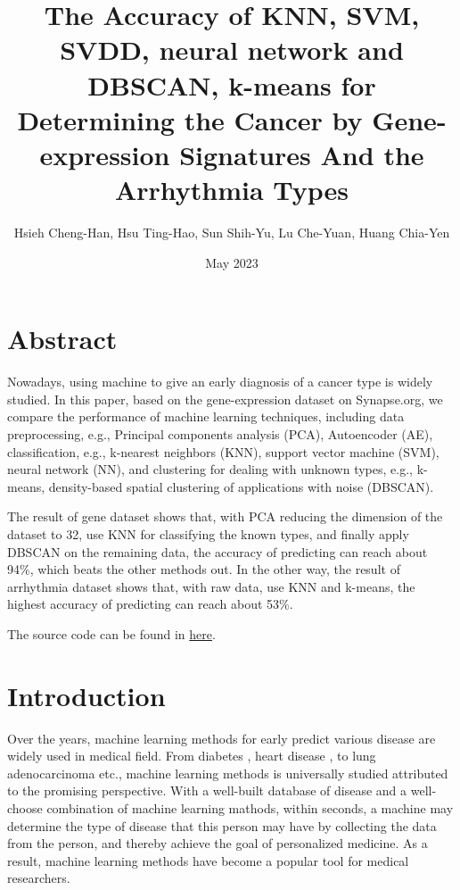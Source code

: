 \documentclass[twocolumn,10pt]{article}
\begin{document}
\title{The Accuracy of KNN, SVM, SVDD, neural network and DBSCAN, k-means for Determining the Cancer by Gene-expression Signatures And the Arrhythmia Types}

\author{Hsieh Cheng-Han, Hsu Ting-Hao, Sun Shih-Yu, Lu Che-Yuan, Huang Chia-Yen}
\date{May 2023}
\maketitle

\section*{Abstract}
Nowadays, using machine to give an early diagnosis of a cancer type is widely studied. 
In this paper, based on the gene-expression dataset on Synapse.org, we compare the performance of machine 
learning techniques, including data preprocessing, e.g., Principal components analysis (PCA), Autoencoder 
(AE), classification, e.g., k-nearest neighbors (KNN), support vector machine (SVM), neural network (NN), 
and clustering for dealing with unknown types, e.g., k-means, density-based spatial clustering of 
applications with noise (DBSCAN). 

The result of gene dataset shows that, with PCA reducing the dimension of the dataset to 32, use KNN for 
classifying the known types, and finally apply DBSCAN on the remaining data, the accuracy of predicting 
can reach about 94\%, which beats the other methods out. In the other way, the result of arrhythmia 
dataset shows that, with raw data, use KNN and k-means, the highest accuracy of predicting can reach about 
53\%.

The source code can be found in \href{https://github.com/OEmiliatanO/CSE\_data\_mining}{here}.

\section{Introduction}
\label{sec:Introduction}
Over the years, machine learning methods for early predict various disease are widely used in medical field. 
\cite{kourou2015machine} \cite{cruz2006applications} From diabetes \cite{kavakiotis2017machine}, 
heart disease \cite{learning2017heart}, to lung adenocarcinoma \cite{huang2020machine} etc., machine learning 
methods is universally studied attributed to the promising perspective. With a well-built database of disease 
and a well-choose combination of machine learning mathods, within seconds, a machine may determine the type of 
disease that this person may have by collecting the data from the person, and thereby achieve the goal of 
personalized medicine. As a result, machine learning methods have become a popular tool for medical researchers. 
\end{document}
